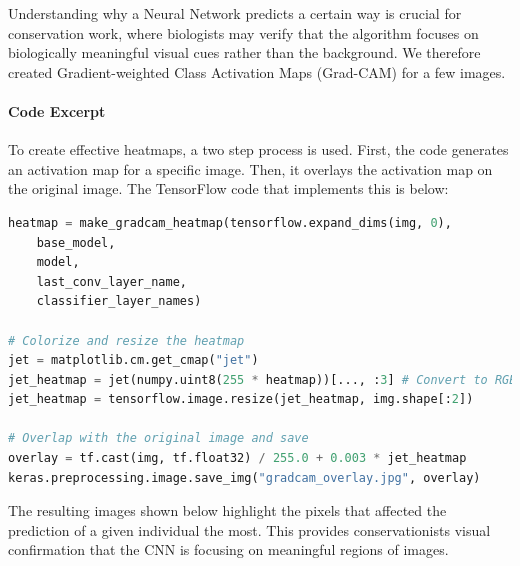 \documentclass[twocolumn]{article}
\begin{document}
Understanding why a Neural Network predicts a certain way is crucial for conservation work, where biologists may verify that the algorithm focuses on biologically meaningful visual cues rather than the background. We therefore created Gradient-weighted Class Activation Maps
(Grad-CAM) for a few images. 

\paragraph{Code Excerpt}

To create effective heatmaps, a two step process is used. First, the code generates an activation map for a specific image. Then, it overlays the activation map on the original image. The TensorFlow code that implements this is below:

\begin{lstlisting}[language=Python,basicstyle=\footnotesize\ttfamily]
heatmap = make_gradcam_heatmap(tensorflow.expand_dims(img, 0),
    base_model,
    model,
    last_conv_layer_name,
    classifier_layer_names)

# Colorize and resize the heatmap
jet = matplotlib.cm.get_cmap("jet")
jet_heatmap = jet(numpy.uint8(255 * heatmap))[..., :3] # Convert to RGB
jet_heatmap = tensorflow.image.resize(jet_heatmap, img.shape[:2])

# Overlap with the original image and save
overlay = tf.cast(img, tf.float32) / 255.0 + 0.003 * jet_heatmap
keras.preprocessing.image.save_img("gradcam_overlay.jpg", overlay)
\end{lstlisting}
The resulting images shown below highlight the pixels that affected the prediction of a given individual the most. This provides conservationists visual confirmation that the CNN is focusing on meaningful regions of images.
\end{document}
